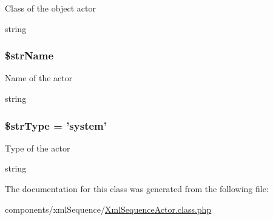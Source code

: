 Class of the object actor

string \hypertarget{class_xml_sequence_actor_90edf7538a74be8ac5ce46baaf203382}{
\subsubsection[{\$strName}]{\setlength{\rightskip}{0pt plus 5cm}\$strName}}
\label{class_xml_sequence_actor_90edf7538a74be8ac5ce46baaf203382}


Name of the actor

string \hypertarget{class_xml_sequence_actor_ac9a08cb422ab9a398d451299b054e28}{
\subsubsection[{\$strType}]{\setlength{\rightskip}{0pt plus 5cm}\$strType = 'system'}}
\label{class_xml_sequence_actor_ac9a08cb422ab9a398d451299b054e28}


Type of the actor

string 

The documentation for this class was generated from the following file:\begin{CompactItemize}
\item 
components/xmlSequence/\hyperlink{_xml_sequence_actor_8class_8php}{XmlSequenceActor.class.php}\end{CompactItemize}
